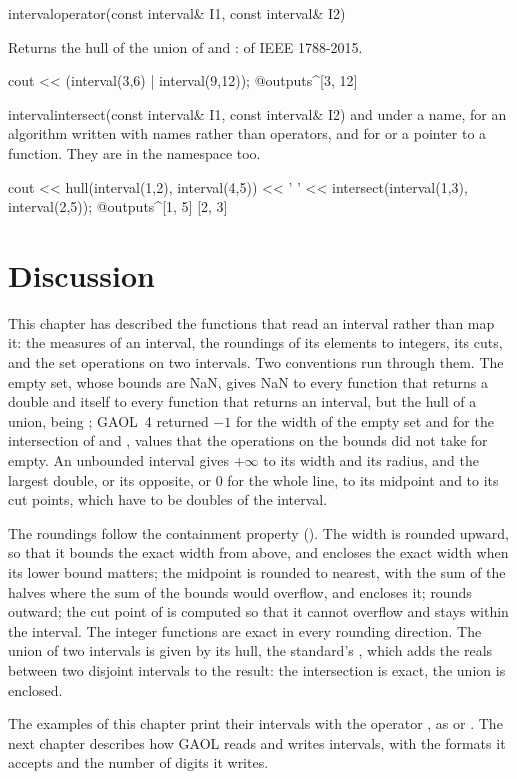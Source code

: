 \begin{deffun}{interval}{operator\textbar}{(const interval\& I1, const interval\& I2)}
  \begin{operation}
  \end{operation}
  Returns the hull of the union of  and : 
  of IEEE 1788-2015.
  \begin{example}
cout << (interval(3,6) | interval(9,12));
@outputs^[3, 12]~
  \end{example}
\end{deffun}

\begin{deffun}{interval}{intersect}{(const interval\& I1, const interval\& I2)}
   and  under a name, for an algorithm written
  with names rather than operators, and for  or a
  pointer to a function. They are in the namespace 
  too.\newinvfive
  \begin{example}
cout << hull(interval(1,2), interval(4,5)) << ' '
     << intersect(interval(1,3), interval(2,5));
@outputs^[1, 5] [2, 3]~
  \end{example}
\end{deffun}

\section{Discussion}

This chapter has described the functions that read an interval rather than
map it: the measures of an interval, the roundings of its elements to
integers, its cuts, and the set operations on two intervals. Two
conventions run through them. The empty set, whose bounds are NaN, gives
NaN to every function that returns a double and itself to every function
that returns an interval, but the hull of a union, 
being ; GAOL~4 returned $-1$ for the width of the empty set and
 for the intersection of  and , values that
the operations on the bounds did not take for empty. An unbounded interval
gives $+\infty$ to its width and its radius, and the largest double, or its
opposite, or $0$ for the whole line, to its midpoint and to its cut points,
which have to be doubles of the interval.

\medskip
The roundings follow the containment property ().
The width is rounded upward, so that it bounds the exact width from above,
and  encloses the exact width when its lower bound
matters; the midpoint is rounded to nearest, with the sum of the halves
where the sum of the bounds would overflow, and  encloses it;
 rounds outward; the cut point of  is
computed so that it cannot overflow and stays within the interval. The
integer functions are exact in every rounding direction. The union of two
intervals is given by its hull, the standard's , which
adds the reals between two disjoint intervals to the result: the
intersection is exact, the union is enclosed.

\medskip
The examples of this chapter print their intervals with the operator
\code{<{}<}, as \code{[4, 4.5]} or \code{[empty]}. The next chapter
describes how GAOL reads and writes intervals, with the formats it accepts
and the number of digits it writes.
